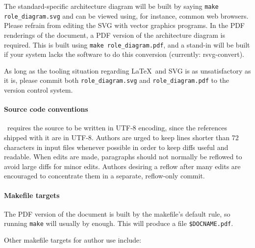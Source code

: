\documentclass[11pt,a4paper]{ivoa}
\begin{document}
The standard-specific
architecture diagram will be built by saying \texttt{make
role\_diagram.svg} and can be viewed using, for instance, common web
browsers.  Please refrain from editing the SVG with vector graphics
programs.  In the PDF renderings of the document,
a PDF version of the architecture diagram is
required.  This is built using \texttt{make role\_diagram.pdf}, and a
stand-in will be built if your system lacks the software to do this
conversion (currently: rsvg-convert).

As long as the tooling situation regarding \LaTeX~and SVG is as
unsatisfactory as it is, please commit both \texttt{role\_diagram.svg} and
\texttt{role\_diagram.pdf} to the version control system.

\paragraph{Source code conventions}

\ivoatex\ requires the source to be written in UTF-8 encoding, since the
references shipped with it are in UTF-8.
Authors are urged to keep lines shorter than 72 characters in input
files whenever possible in order to keep diffs useful and readable.
When edits are made, paragraphs should not normally be reflowed to avoid
large diffs for minor edits.  Authors desiring a reflow after many edits
are encouraged to concentrate them in a separate, reflow-only commit.

\paragraph{Makefile targets}

The PDF version of the document is built by the makefile's default rule,
so running \texttt{make} will usually by enough.  This will produce a
file \texttt{\$DOCNAME.pdf}.

Other makefile targets for author use include:
\end{document}
